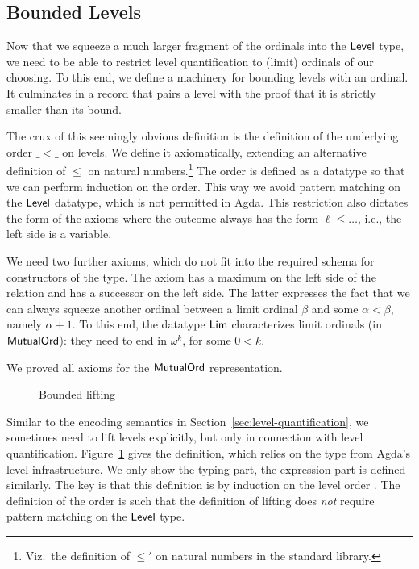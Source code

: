 \documentclass[manuscript,screen,review,anonymous]{acmart}
\begin{document}
\subsection{Bounded Levels}
\label{sec:bounded-levels}

Now that we squeeze a much larger fragment of the ordinals into the
$\ALevel$ type, we need to be able to restrict level quantification to
(limit) ordinals of our choosing. To this end, we define a machinery
for bounding levels with an ordinal. It culminates in a record that
pairs a level with the proof that it is strictly smaller than its bound.

\BQBoundedLevel

The crux of this seemingly obvious definition is the definition of the
underlying order $\_<\_$ on levels. We define it axiomatically,
extending an alternative definition of $\le$ on natural
numbers.\footnote{Viz.\ the definition of $\le'$ on natural numbers in
  the standard library.} The order is defined as a datatype so that we
can perform induction on the order. This way we avoid pattern matching
on the $\ALevel$ datatype, which is not permitted in Agda. This
restriction also dictates the form of the axioms where the outcome
always has the form $\ell \le \dots$, i.e., the left side is a variable.

\begin{minipage}{0.45\linewidth}
  \BQLevelLe
  \BQLevelLt
\end{minipage}
\begin{minipage}{0.45\linewidth}
  \BQLim
  \BQAxiomsLe
\end{minipage}

We need two further axioms, which do not fit into the required schema
for constructors of the \AgdaFunction{$\_\le\_$} type. The axiom {\ALeLubLub} has a maximum on
the left side of the relation and {\ALtSucLim} has a successor on the
left side. The latter expresses the fact that we can always squeeze
another ordinal between a limit ordinal $\beta$ and some
$\alpha<\beta$, namely $\alpha+1$. To this end, the datatype $\ALim$
characterizes limit ordinals (in $\AMutualOrd$): they need to end in
$\omega^k$, for some $0<k$. 

We proved all axioms for the $\AMutualOrd$ representation.

\begin{figure}[tp]
  \BQBoundedLift
  \caption{Bounded lifting}
  \label{fig:eh-bounded-lifting}
\end{figure}
Similar to the encoding semantics in
Section~\ref{sec:level-quantification}, we sometimes need to lift
levels explicitly, but only in connection with level
quantification. Figure~\ref{fig:eh-bounded-lifting} gives the
definition, which relies on the {\ALift} type from Agda's level
infrastructure. We only show the typing part, the expression part is
defined similarly. The key is that this definition is by induction on
the level order \AgdaFunction{$\_\le\_$}. The definition of the order is such that
the definition of lifting does \emph{not} require pattern matching on
the $\ALevel$ type.
\end{document}
